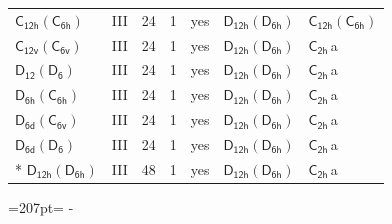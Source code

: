 \documentclass[10pt,a4paper]{article}
\newcommand{\needspace}[1]{\par\penalty-100\begingroup\dimen0=#1\relax\dimen2=\pagegoal
  \advance\dimen2-\pagetotal\ifdim\dimen0>\dimen2\relax\ifdim\dimen2>0pt\vfil\break\fi\fi
  \endgroup}
\numberwithin{equation}{section}
\newcommand{\grp}[1]{\mathsf{#1}}
\newcommand{\clsletter}[1]{\,{\scriptsize\color{black!55}#1}}
\begin{document}
{\begin{longtable}{@{}llrrlll@{}}
\href{C12h-C6h.pdf}{$\grp{C_{12h}}(\grp{C_{6h}})$} & III & 24 & 1 & yes & \href{D12h-D6h.pdf}{$\grp{D_{12h}}(\grp{D_{6h}})$} & \href{C12h-C6h.pdf}{$\grp{C_{12h}}(\grp{C_{6h}})$}\\
\href{C12v-C6v.pdf}{$\grp{C_{12v}}(\grp{C_{6v}})$} & III & 24 & 1 & yes & \href{D12h-D6h.pdf}{$\grp{D_{12h}}(\grp{D_{6h}})$} & \href{../../../rotation/data/pdf/C2h.pdf}{$\grp{C_{2h}}$}\clsletter{a}\\
\href{D12-D6.pdf}{$\grp{D_{12}}(\grp{D_{6}})$} & III & 24 & 1 & yes & \href{D12h-D6h.pdf}{$\grp{D_{12h}}(\grp{D_{6h}})$} & \href{../../../rotation/data/pdf/C2h.pdf}{$\grp{C_{2h}}$}\clsletter{a}\\
\href{D6h-C6h.pdf}{$\grp{D_{6h}}(\grp{C_{6h}})$} & III & 24 & 1 & yes & \href{D12h-D6h.pdf}{$\grp{D_{12h}}(\grp{D_{6h}})$} & \href{../../../rotation/data/pdf/C2h.pdf}{$\grp{C_{2h}}$}\clsletter{a}\\
\href{D6d-C6v.pdf}{$\grp{D_{6d}}(\grp{C_{6v}})$} & III & 24 & 1 & yes & \href{D12h-D6h.pdf}{$\grp{D_{12h}}(\grp{D_{6h}})$} & \href{../../../rotation/data/pdf/C2h.pdf}{$\grp{C_{2h}}$}\clsletter{a}\\
\href{D6d-D6.pdf}{$\grp{D_{6d}}(\grp{D_{6}})$} & III & 24 & 1 & yes & \href{D12h-D6h.pdf}{$\grp{D_{12h}}(\grp{D_{6h}})$} & \href{../../../rotation/data/pdf/C2h.pdf}{$\grp{C_{2h}}$}\clsletter{a}\\*
\href{D12h-D6h.pdf}{$\grp{D_{12h}}(\grp{D_{6h}})$} & III & 48 & 1 & yes & \href{D12h-D6h.pdf}{$\grp{D_{12h}}(\grp{D_{6h}})$} & \href{../../../rotation/data/pdf/C2h.pdf}{$\grp{C_{2h}}$}\clsletter{a}\\
\bottomrule\end{longtable}}
\needspace{207pt}
\end{document}
